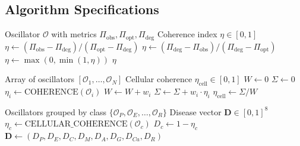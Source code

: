\documentclass[10pt,twocolumn]{article}
\theoremstyle{plain}
\theoremstyle{definition}
\theoremstyle{remark}
\newcommand{\etacell}{\eta_{\mathrm{cell}}}
\newcommand{\Dvec}{\mathbf{D}}
\begin{document}
\subsection{Algorithm Specifications}

\begin{algorithm}[h]
\caption{COHERENCE: Compute oscillator coherence index}
\label{alg:coherence}
\begin{algorithmic}[1]
\REQUIRE Oscillator $\mathcal{O}$ with metrics $\Pi_{\mathrm{obs}}, \Pi_{\mathrm{opt}}, \Pi_{\mathrm{deg}}$
\ENSURE Coherence index $\eta \in [0,1]$
    \STATE $\eta \leftarrow (\Pi_{\mathrm{obs}} - \Pi_{\mathrm{deg}}) / (\Pi_{\mathrm{opt}} - \Pi_{\mathrm{deg}})$
\ELSE
    \STATE $\eta \leftarrow (\Pi_{\mathrm{deg}} - \Pi_{\mathrm{obs}}) / (\Pi_{\mathrm{deg}} - \Pi_{\mathrm{opt}})$
\ENDIF
\STATE $\eta \leftarrow \max(0, \min(1, \eta))$ 
\RETURN $\eta$
\end{algorithmic}
\end{algorithm}

\begin{algorithm}[h]
\caption{CELLULAR\_COHERENCE: Compute cellular coherence}
\label{alg:cellular}
\begin{algorithmic}[1]
\REQUIRE Array of oscillators $[\mathcal{O}_1, \ldots, \mathcal{O}_N]$
\ENSURE Cellular coherence $\etacell \in [0,1]$
\STATE $W \leftarrow 0$
\STATE $\Sigma \leftarrow 0$
    \STATE $\eta_i \leftarrow \text{COHERENCE}(\mathcal{O}_i)$
    \STATE $W \leftarrow W + w_i$
    \STATE $\Sigma \leftarrow \Sigma + w_i \cdot \eta_i$
\ENDFOR
\RETURN $\etacell \leftarrow \Sigma / W$
\end{algorithmic}
\end{algorithm}

\begin{algorithm}[h]
\caption{DISEASE\_VECTOR: Compute disease state vector}
\label{alg:disease}
\begin{algorithmic}[1]
\REQUIRE Oscillators grouped by class $\{\mathcal{O}_{P}, \mathcal{O}_{E}, \ldots, \mathcal{O}_{R}\}$
\ENSURE Disease vector $\Dvec \in [0,1]^8$
    \STATE $\eta_c \leftarrow \text{CELLULAR\_COHERENCE}(\mathcal{O}_c)$
    \STATE $D_c \leftarrow 1 - \eta_c$
\ENDFOR
\RETURN $\Dvec \leftarrow (D_P, D_E, D_C, D_M, D_A, D_G, D_{Ca}, D_R)$
\end{algorithmic}
\end{algorithm}
\end{document}
